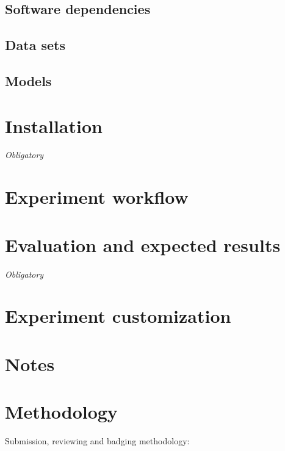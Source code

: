 \subsection{Software dependencies}

\subsection{Data sets}

\subsection{Models}

\section{Installation}

{\em Obligatory}

\section{Experiment workflow}

\section{Evaluation and expected results}

{\em Obligatory}

\section{Experiment customization}

\section{Notes}

\section{Methodology}

Submission, reviewing and badging methodology:

